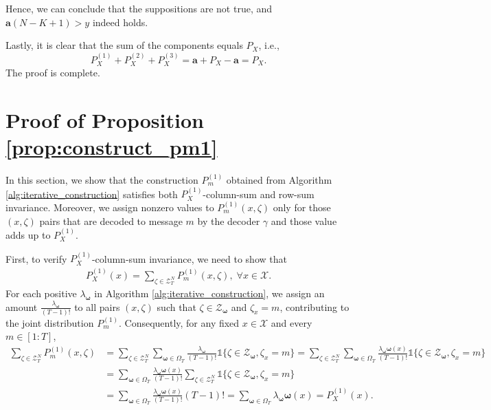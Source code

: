 \documentclass[11pt,letterpaper]{article}
\newcommand{\cX}{\mathcal{X}}
\newcommand{\cZ}{\mathcal{Z}}
\begin{document}
Hence, we can conclude that the suppositions are not true, and $\boldsymbol{a}(N-K+1) > y$ indeed holds.


Lastly, it is clear that the sum of the components equals $P_X$, i.e.,
\[ P_X^{(1)} + P_X^{(2)} + P_X^{(3)} = \boldsymbol{a} + P_X - \boldsymbol{a} = P_X. \]
The proof is complete.


\section{Proof of Proposition \ref{prop:construct_pm1}} \label{sec:proof_pm1}
In this section, we show that the construction $P_m^{(1)}$ obtained from Algorithm \ref{alg:iterative_construction} satisfies both $P_X^{(1)}$-column-sum and row-sum invariance. Moreover, we assign nonzero values to $P_m^{(1)}(x,\zeta)$ only for those $(x,\zeta)$ pairs that are decoded to message $m$ by the decoder $\gamma$ and those value adds up to $P_X^{(1)}$.

First, to verify $P_X^{(1)}$-column-sum invariance, we need to show that 
\begin{align}
    P_X^{(1)}(x) = \sum_{\zeta \in \cZ^N_T} P_m^{(1)}(x,\zeta), \; \forall x \in \cX. 
\end{align}
For each positive $\lambda_{\boldsymbol{\omega}}$ in Algorithm \ref{alg:iterative_construction}, we assign an amount $\tfrac{\lambda_{\boldsymbol{\omega}}}{(T-1)!}$ to all pairs $(x,\zeta)$ such that $\zeta \in \cZ_{\boldsymbol{\omega}}$ and $\zeta_x = m$, contributing to the joint distribution $P_m^{(1)}$. Consequently, for any fixed $x \in \cX$ and every $m \in [1:T]$,
\begin{align}
    \sum_{\zeta \in \cZ^N_T} P_m^{(1)}(x,\zeta) & =  \sum_{\zeta \in \cZ^N_T} \sum _{\boldsymbol{\omega} \in \Omega_T}\tfrac{\lambda_{\boldsymbol{\omega}}}{(T-1)!} \mathds{1}\{\zeta \in \cZ_{\boldsymbol{\omega}}, \zeta_x =m \} =  \sum_{\zeta \in \cZ^N_T} \sum _{\boldsymbol{\omega} \in \Omega_T}\tfrac{\lambda_{\boldsymbol{\omega}}{\boldsymbol{\omega}}(x)}{(T-1)!} \mathds{1}\{\zeta \in \cZ_{\boldsymbol{\omega}}, \zeta_x =m \}\label{eq:alg_pm1_column-sum-pf1}\\
    & = \sum_{\boldsymbol{\omega}\in \Omega_T}\tfrac{\lambda_{\boldsymbol{\omega}}{\boldsymbol{\omega}}(x)}{(T-1)!} \sum_{\zeta \in \cZ^N_T}\mathds{1}\{\zeta \in \cZ_{\boldsymbol{\omega}}, \zeta_x =m \} \\
    & = \sum_{\boldsymbol{\omega}\in \Omega_T}\tfrac{\lambda_{\boldsymbol{\omega}}{\boldsymbol{\omega}}(x)}{(T-1)!} (T-1)! = \sum_{\boldsymbol{\omega}\in \Omega_T} \lambda_{\boldsymbol{\omega}}\boldsymbol{\omega}(x) = P_X^{(1)}(x). \label{eq:alg_pm1_column-sum-pf3}
\end{align}
\end{document}
